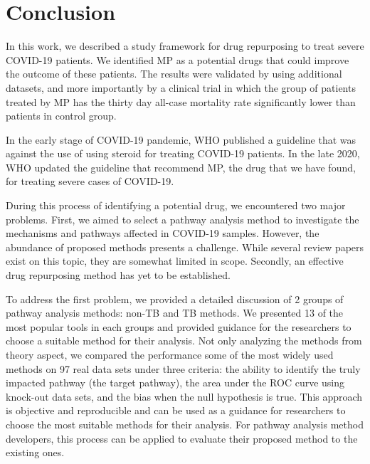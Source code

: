 \section{Conclusion}

In this work, we described a study framework for drug repurposing to treat severe COVID-19 patients. We identified MP as a potential drugs that could improve the outcome of these patients. The results were validated by using additional datasets, and more importantly by a clinical trial in which the group of patients treated by MP has the thirty day all-case mortality rate significantly lower than patients in control group. 

In the early stage of COVID-19 pandemic, WHO published a guideline that was against the use of using steroid for treating COVID-19 patients. In the late 2020, WHO updated the guideline that recommend MP, the drug that we have found, for treating severe cases of COVID-19. 

During this process of identifying a potential drug, we encountered two major problems. First, we aimed to select a pathway analysis method to investigate the mechanisms and pathways affected in COVID-19 samples. However, the abundance of proposed methods presents a challenge. While several review papers exist on this topic, they are somewhat limited in scope. Secondly, an effective drug repurposing method has yet to be established.

To address the first problem, we provided a detailed discussion of 2 groups of pathway analysis methods: non-TB and TB methods. We presented 13 of the most popular tools in each groups and provided guidance for the researchers to choose a suitable method for their analysis. Not only analyzing the methods from theory aspect, we compared the performance some of the most widely used methods on 97 real data sets under three criteria: the ability to identify the truly impacted pathway (the target pathway), the area under the ROC curve using knock-out data sets, and the bias when the null hypothesis is true. This approach is objective and reproducible and can be used as a guidance for researchers to choose the most suitable methods for their analysis. For pathway analysis method developers, this process can be applied to evaluate their proposed method to the existing ones. 

